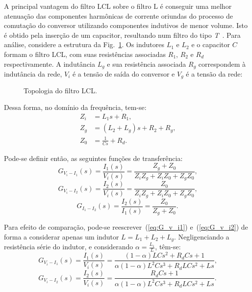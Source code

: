   A principal vantagem do filtro LCL sobre o filtro L é conseguir uma melhor atenuação das componentes harmônicas de corrente oriundas do processo de comutação do conversor utilizando componentes indutivos de menor volume. Isto é obtido pela inserção de um capacitor, resultando num filtro do tipo \emph{T}~\cite{ref:SHEN}. Para análise, considere a estrutura da Fig.~\ref{fig:LCL_topologia}. Os indutores $L_1$ e $L_2$ e o capacitor $C$ formam o filtro LCL, com suas resistências associadas $R_1$, $R_2$ e $R_d$ respectivamente. A indutância $L_g$ e sua resistência associada $R_g$ correspondem à indutância da rede, $V_i$ é a tensão de saída do conversor e $V_g$ é a tensão da rede:

  \begin{figure}[htb]
    \centering{
      \def\svgwidth{\textwidth}
      }
    \renewcommand\figurename{Fig.}
    \caption{Topologia do filtro LCL.}
    \label{fig:LCL_topologia}
  \end{figure}

  Dessa forma, no domínio da frequência, tem-se:
  \begin{equation}
  	\begin{split}
      Z_i & = L_1s +R_1 \text{,} \\
      Z_g & = (L_2 + L_g)s + R_2 + R_g \text{,} \\
      Z_0 & = \frac{1}{Cs} + R_d \text{.}
    \end{split}
  \end{equation}

  Pode-se definir então, as seguintes funções de transferência:
  \begin{equation}
    G_{V_i-I_1}(s) = \frac{I_1(s)}{V_i(s)} = \frac{Z_g + Z_0}{Z_iZ_g
    	+ Z_iZ_0 + Z_gZ_0} \text{,}
    \label{eq:G_v_i1}
  \end{equation}
  \begin{equation}
    G_{V_i-I_2}(s) = \frac{I_2(s)}{V_i(s)} = \frac{Z_0}{Z_iZ_g
    	+ Z_iZ_0 + Z_gZ_0} \text{,}
    \label{eq:G_v_i2}
  \end{equation}
  \begin{equation}
    G_{I_1-I_2}(s) = \frac{I_2(s)}{I_1(s)} = \frac{Z_0}{Z_g + Z_0}
    	 \text{.}
    \label{eq:G_i1_i2}
  \end{equation}

  Para efeito de comparação, pode-se reescrever~(\ref{eq:G_v_i1}) e~(\ref{eq:G_v_i2}) de forma a considerar apenas um indutor $L = L_1 + L_2 + L_g$. Negligenciando a resistência série do indutor, e considerando $\alpha = \frac{L_1}{L}$, têm-se:
  \begin{equation}
    G_{V_i-I_1}(s) = \frac{I_1(s)}{V_i(s)} =
    	\frac{(1-\alpha)LCs^2+R_dCs+1}{\alpha(1-\alpha)L^2Cs^3+R_dLCs^2+Ls} \text{,}
  \end{equation}
  \begin{equation}
    G_{V_i-I_2}(s) = \frac{I_2(s)}{V_i(s)} =
    	\frac{R_dCs+1}{\alpha(1-\alpha)L^2Cs^3+R_dLCs^2+Ls}  \text{.}
    \label{eq:G_v_i2_2}
  \end{equation}

